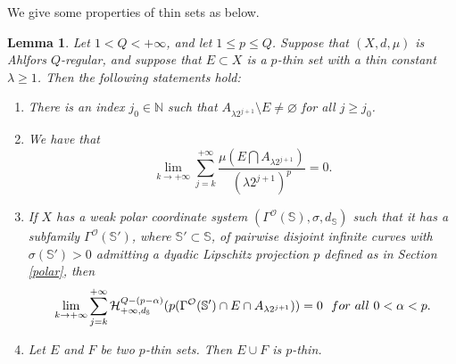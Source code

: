 \documentclass[10pt]{amsart}
\newtheorem{lemma}[theorem]{Lemma}
\numberwithin{equation}{section}
\begin{document}
We give some properties of thin sets as below.
 

	 \begin{lemma} \label{prop2.5-0605}
	 Let  $1<Q<{+\infty}$, and let $1\le p\le Q$. Suppose that $(X,d,\mu)$ is Ahlfors $Q$-regular, and suppose that $E\subset X$ is a $p$-thin set with a thin constant $\lambda\geq 1$. Then the following statements hold:
	 	\begin{enumerate}[label=\arabic*.]
			\item 
   There is an index $j_0\in\mathbb N$ such that  $A_{\lambda 2^{j+1}}\setminus E\ne\varnothing$ for all $j\geq j_0$. 
            \item
We have that
				\begin{equation}\label{eq2.4-0306}
		\lim_{k\to{+\infty}}\sum_{j=k}^{+\infty} \frac{\mu(E\bigcap A_{\lambda 2^{j+1}})}{(\lambda 2^{j+1})^p}=0.
				\end{equation}
			\item  
	{
	  If $X$ has a  weak polar coordinate system $(\Gamma^{\mathcal O}(\mathbb S), \sigma, d_{\mathbb S})$ such that it has a subfamily $\Gamma^{\mathcal O}(\mathbb S')$, where $\mathbb S'\subset\mathbb S$, of pairwise disjoint infinite curves with $\sigma(\mathbb S')>0$  admitting  a dyadic Lipschitz projection $p$ defined as in Section \ref{polar}, then
				\[
					\lim_{k\to{+\infty}}\sum_{j=k}^{+\infty} \mathcal H^{Q-(p-\alpha)}_{+\infty, d_{\mathbb S}} (p(\Gamma^{\mathcal O}(\mathbb S')\cap E\cap A_{\lambda 2^{j+1}}))=0 {\rm \ \ for \ all\ } 0<\alpha<p.
				\]
	}
			\item Let $E$ and $F$ be two $p$-thin sets. Then $E\cup F$ is $p$-thin.
 
		\end{enumerate}
	 \end{lemma}
\end{document}
